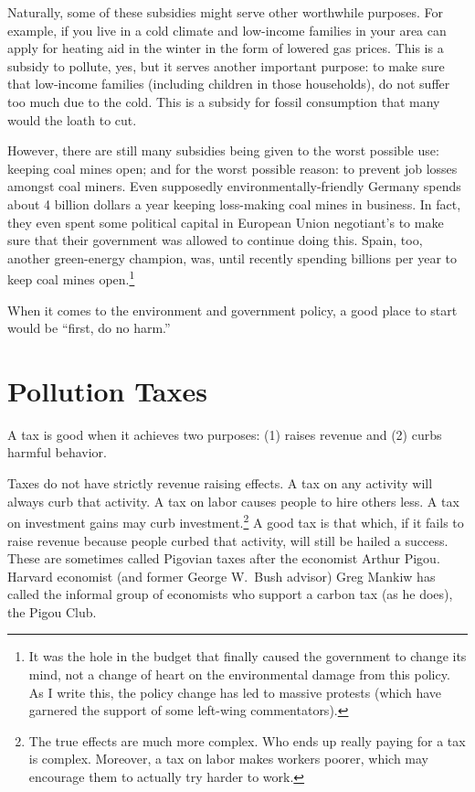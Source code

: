 Naturally, some of these subsidies might serve other worthwhile purposes. For
example, if you live in a cold climate and low-income families in your area can
apply for heating aid in the winter in the form of lowered gas prices. This is
a subsidy to pollute, yes, but it serves another important purpose: to make
sure that low-income families (including children in those households), do not
suffer too much due to the cold. This is a subsidy for fossil consumption that
many would the loath to cut.


However, there are still many subsidies being given to the worst possible use:
keeping coal mines open; and for the worst possible reason: to prevent job
losses amongst coal miners. Even supposedly environmentally-friendly Germany
spends about 4 billion dollars a year keeping loss-making coal mines in
business. In fact, they even spent some political capital in European Union
negotiant's to make sure that their government was allowed to continue doing
this. Spain, too, another green-energy champion, was, until recently spending
billions per year to keep coal mines open.\footnote{It was the hole in the
budget that finally caused the government to change its mind, not a change of
heart on the environmental damage from this policy. As I write this, the policy
change has led to massive protests (which have garnered the support of some
left-wing commentators).}

When it comes to the environment and government policy, a good place to start
would be ``first, do no harm.''


\section{Pollution Taxes}

A tax is good when it achieves two purposes: (1) raises revenue and (2) curbs
harmful behavior.

Taxes do not have strictly revenue raising effects. A tax on any activity will
always curb that activity. A tax on labor causes people to hire others
less. A tax on investment gains may curb investment.\footnote{The true effects
are much more complex. Who ends up really paying for a tax is complex.
Moreover, a tax on labor makes workers poorer, which may encourage them to
actually try harder to work.} A good tax is that which, if it fails to raise
revenue because people curbed that activity, will still be hailed a success.
These are sometimes called Pigovian taxes after the economist Arthur Pigou.
Harvard economist (and former George W.\ Bush advisor) Greg Mankiw has called
the informal group of economists who support a carbon tax (as he does), the
Pigou Club.

